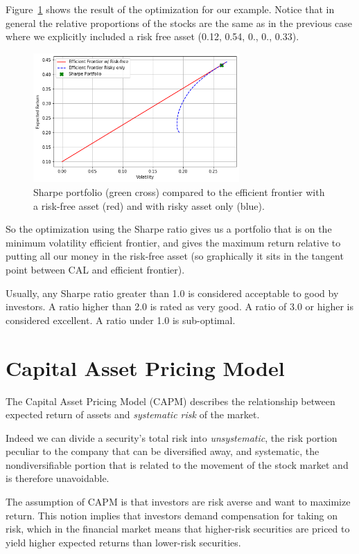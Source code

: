 Figure~\ref{fig:sharpe_ratio} shows the result of the optimization for our example.    
Notice that in general the relative proportions of the stocks are the
same as in the previous case where we explicitly included a risk free
asset (0.12, 0.54, 0., 0., 0.33).

\begin{figure}[htb]
	\centering
	\includegraphics[width=0.7\textwidth]{figures/sharpe_ratio.png}
	\caption{Sharpe portfolio (green cross) compared to the efficient frontier with a risk-free asset (red) and with risky asset only (blue).}
	\label{fig:sharpe_ratio}
\end{figure}

So the optimization using the Sharpe ratio gives us a portfolio that is
on the minimum volatility efficient frontier, and gives the maximum
return relative to putting all our money in the risk-free asset (so graphically it sits in the 
tangent point between CAL and efficient frontier).

Usually, any Sharpe ratio greater than 1.0 is considered acceptable to good by investors. A ratio higher than 2.0 is rated as very good. A ratio of 3.0 or higher is considered excellent. A ratio under 1.0 is sub-optimal.

\section{Capital Asset Pricing Model}
\label{sec:capm}
The Capital Asset Pricing Model (CAPM) describes the relationship between expected return of assets and \emph{systematic risk} of the market.

Indeed we can divide a security’s total risk into \emph{unsystematic}, the risk portion peculiar to the company that can be diversified away, and systematic, the nondiversifiable portion that is related to the movement of the stock market and is therefore unavoidable. 

The assumption of CAPM is that investors are risk averse and want to maximize return. This notion implies that investors demand compensation for taking on risk, which in the financial market means that higher-risk securities are priced to yield higher expected returns than lower-risk securities. 

